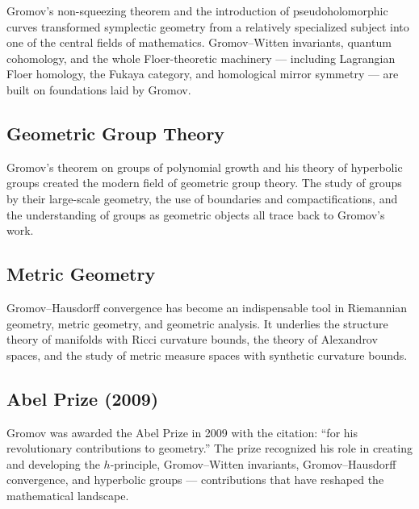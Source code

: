 Gromov's non-squeezing theorem and the introduction of pseudoholomorphic curves transformed symplectic geometry from a relatively specialized subject into one of the central fields of mathematics. Gromov--Witten invariants, quantum cohomology, and the whole Floer-theoretic machinery --- including Lagrangian Floer homology, the Fukaya category, and homological mirror symmetry --- are built on foundations laid by Gromov.

\subsection{Geometric Group Theory}

Gromov's theorem on groups of polynomial growth and his theory of hyperbolic groups created the modern field of geometric group theory. The study of groups by their large-scale geometry, the use of boundaries and compactifications, and the understanding of groups as geometric objects all trace back to Gromov's work.

\subsection{Metric Geometry}

Gromov--Hausdorff convergence has become an indispensable tool in Riemannian geometry, metric geometry, and geometric analysis. It underlies the structure theory of manifolds with Ricci curvature bounds, the theory of Alexandrov spaces, and the study of metric measure spaces with synthetic curvature bounds.

\subsection{Abel Prize (2009)}

Gromov was awarded the Abel Prize in 2009 with the citation: ``for his revolutionary contributions to geometry.'' The prize recognized his role in creating and developing the \(h\)-principle, Gromov--Witten invariants, Gromov--Hausdorff convergence, and hyperbolic groups --- contributions that have reshaped the mathematical landscape.

